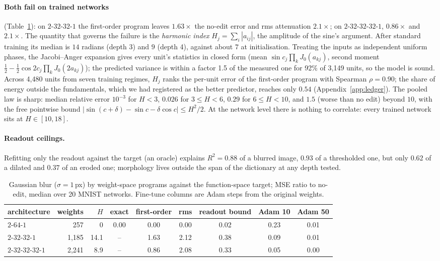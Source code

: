 \documentclass[11pt]{article}
\begin{document}
\paragraph{Both fail on trained networks} (Table~\ref{tab:depth}): on $2$-$32$-$32$-$1$ the first-order program leaves $1.63\times$ the no-edit error and rms attenuation $2.1\times$; on $2$-$32$-$32$-$32$-$1$, $0.86\times$ and $2.1\times$. The quantity that governs the failure is the \emph{harmonic index} $H_j=\sum_i|a_{ij}|$, the amplitude of the sine's argument. After standard training its median is $14$ radians (depth 3) and $9$ (depth 4), against about $7$ at initialisation. Treating the inputs as independent uniform phases, the Jacobi--Anger expansion gives every unit's statistics in closed form (mean $\sin c_j\prod_kJ_0(a_{kj})$, second moment $\tfrac12-\tfrac12\cos2c_j\prod_kJ_0(2a_{kj})$); the predicted variance is within a factor 1.5 of the measured one for 92\% of 3,149 units, so the model is sound. Across 4,480 units from seven training regimes, $H_j$ ranks the per-unit error of the first-order program with Spearman $\rho=0.90$; the share of energy outside the fundamentals, which we had registered as the better predictor, reaches only $0.54$ (Appendix~\ref{app:ledger}). The pooled law is sharp: median relative error $10^{-3}$ for $H<3$, $0.026$ for $3\le H<6$, $0.29$ for $6\le H<10$, and $1.5$ (worse than no edit) beyond $10$, with the free pointwise bound $|\sin(c+\delta)-\sin c-\delta\cos c|\le H^2/2$. At the network level there is nothing to correlate: every trained network sits at $H\in[10,18]$.

\paragraph{Readout ceilings.} Refitting only the readout against the target (an oracle) explains $R^2=0.88$ of a blurred image, $0.93$ of a thresholded one, but only $0.62$ of a dilated and $0.37$ of an eroded one; morphology lives outside the span of the dictionary at any depth tested.

\begin{table}[t]\centering\small
\caption{Gaussian blur ($\sigma=1$\,px) by weight-space programs against the function-space target; MSE ratio to no-edit, median over 20 MNIST networks. Fine-tune columns are Adam steps from the original weights.}
\label{tab:depth}
\begin{tabular}{lrrcccccc}\toprule
architecture & weights & $H$ & exact & first-order & rms & readout bound & Adam 10 & Adam 50\\\midrule
$2$-$64$-$1$ & 257 & 0 & $0.00$ & $0.00$ & $0.00$ & 0.02 & 0.23 & 0.01\\
$2$-$32$-$32$-$1$ & 1,185 & 14.1 & -- & 1.63 & 2.12 & 0.38 & 0.09 & 0.01\\
$2$-$32$-$32$-$32$-$1$ & 2,241 & 8.9 & -- & 0.86 & 2.08 & 0.33 & 0.05 & 0.00\\\bottomrule
\end{tabular}
\end{table}
\end{document}
